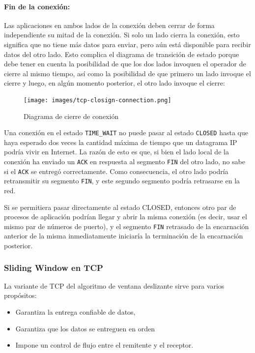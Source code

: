 \paragraph{Fin de la conexión:} 
Las aplicaciones en ambos lados de la conexión deben cerrar de forma independiente su mitad de la conexión. Si solo un lado cierra la conexión, esto significa que no tiene más datos para enviar, pero aún está disponible para recibir datos del otro lado. Esto complica el diagrama de transición de estado porque debe tener en cuenta la posibilidad de que los dos lados invoquen el operador de cierre al mismo tiempo, así como la posibilidad de que primero un lado invoque el cierre y luego, en algún momento posterior, el otro lado invoque el cierre:

\begin{figure}[H]
	\centering
	\texttt{[image: images/tcp-closign-connection.png]}
	\caption[Diagrama de cierre de conexión]{Diagrama de cierre de conexión}
	\label{fig:tcp-closign-connection}
\end{figure}


Una conexión en el estado \texttt{TIME_WAIT} no puede pasar al estado \texttt{CLOSED} hasta que haya esperado dos veces la cantidad máxima de tiempo que un datagrama IP podría vivir en Internet. La razón de esto es que, si bien el lado local de la conexión ha enviado un \texttt{ACK} en respuesta al segmento \texttt{FIN} del otro lado, no sabe si el \texttt{ACK} se entregó correctamente. Como consecuencia, el otro lado podría retransmitir su segmento \texttt{FIN}, y este segundo segmento podría retrasarse en la red. 

Si se permitiera pasar directamente al estado CLOSED, entonces otro par de procesos de aplicación podrían llegar y abrir la misma conexión (es decir, usar el mismo par de números de puerto), y el segmento \texttt{FIN} retrasado de la encarnación anterior de la misma inmediatamente iniciaría la terminación de la encarnación posterior.

\subsubsection*{Sliding Window en TCP}
La variante de TCP del algoritmo de ventana deslizante sirve para varios propósitos:
\begin{itemize}
  \item Garantiza la entrega confiable de datos,
  \item Garantiza que los datos se entreguen en orden
  \item Impone un control de flujo entre el remitente y el receptor.
\end{itemize} 

